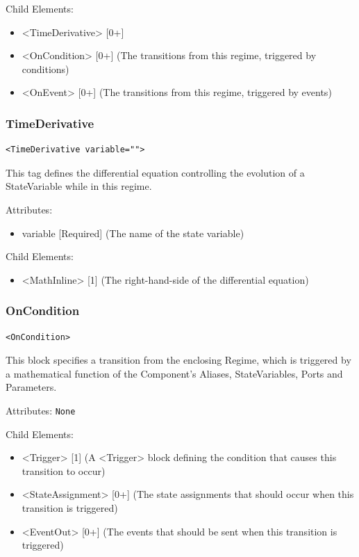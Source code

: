 \documentclass{article}
\begin{document}
Child Elements:
%
\begin{itemize}
\item <TimeDerivative> {[}0+{]}
\item <OnCondition> {[}0+{]} (The transitions from this regime, triggered by conditions)
\item <OnEvent> {[}0+{]} (The transitions from this regime, triggered by events)
\end{itemize}

\subsubsection{TimeDerivative}
%
\begin{lstlisting}
<TimeDerivative variable="">
\end{lstlisting}

This tag defines the differential equation controlling the evolution of a StateVariable while
in this regime.

Attributes:
%
\begin{itemize}
\item variable {[}Required{]} (The name of the state variable)
\end{itemize}

Child Elements:
%
\begin{itemize}
\item <MathInline> {[}1{]} (The right-hand-side of the differential equation)
\end{itemize}

\subsubsection{OnCondition}
%
\begin{lstlisting}
<OnCondition>
\end{lstlisting}

This block specifies a transition from the enclosing Regime, which is triggered
by a mathematical function of the Component's Aliases, StateVariables, Ports and
Parameters.

Attributes: \texttt{None}

Child Elements:
%
\begin{itemize}
\item <Trigger> {[}1{]} (A <Trigger> block defining the condition that causes this transition to occur)
\item <StateAssignment> {[}0+{]} (The state assignments that should occur when this
transition is triggered)
\item <EventOut> {[}0+{]} (The events that should be sent when this transition is triggered)
\end{itemize}
\end{document}

